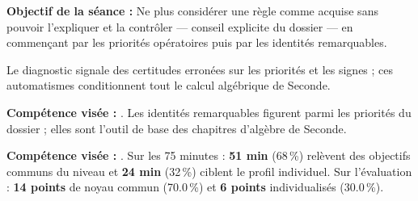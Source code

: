 \documentclass[10pt,a4paper]{article}
\begin{document}
\begin{goalbox}\textbf{Objectif de la séance :} Ne plus considérer une règle comme acquise sans pouvoir l'expliquer et la contrôler — conseil explicite du dossier — en commençant par les priorités opératoires puis par les identités remarquables.\end{goalbox}
Le diagnostic signale des certitudes erronées sur les priorités et les signes ; ces automatismes conditionnent tout le calcul algébrique de Seconde.
\par\vspace{1mm}\textbf{Compétence visée :} .
Les identités remarquables figurent parmi les priorités du dossier ; elles sont l'outil de base des chapitres d'algèbre de Seconde.
\par\vspace{1mm}\textbf{Compétence visée :} .
Sur les 75 minutes : \textbf{51 min} (68\,\%) relèvent des objectifs communs du niveau et \textbf{24 min} (32\,\%) ciblent le profil individuel. Sur l'évaluation : \textbf{14 points} de noyau commun (70.0\,\%) et \textbf{6 points} individualisés (30.0\,\%).
\newpage{}
\end{document}
